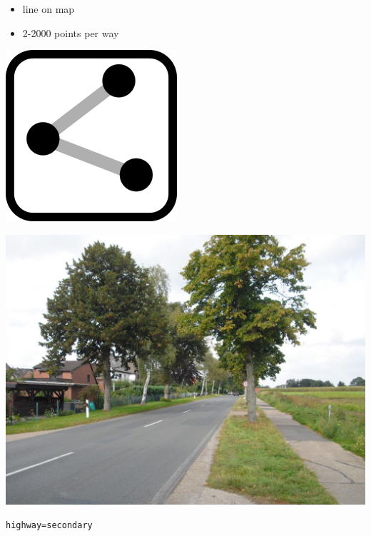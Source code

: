 \documentclass{beamer}
\begin{document}
	\begin{frame}
		\begin{itemize}
			\item line on map
			\item 2-2000 points per way
		\end{itemize}
		
		\vfill
		
		\begin{center}
			\begin{minipage}[b][0.6\textheight][c]{0.2\linewidth}
				\centering
				\includegraphics[width=0.5\linewidth,height=0.5\textheight,keepaspectratio]{images/240px-Mf_way.png}
			\end{minipage}
			\begin{minipage}[b][0.6\textheight][c]{0.4\linewidth}
				\centering
				\includegraphics[width=0.8\linewidth,height=0.8\textheight,keepaspectratio]{images/Meyenburg-L134.jpg}
			\end{minipage}
			\begin{minipage}[b][0.6\textheight][c]{0.3\linewidth}
				\texttt{highway=secondary}
				\begin{center}

\end{center}
\end{minipage}
\end{center}
\end{frame}
\end{document}
